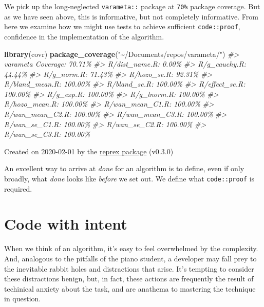 \documentclass[
]{article}
\newenvironment{Shaded}{\begin{snugshade}}{\end{snugshade}}
\newcommand{\CommentTok}[1]{\textcolor[rgb]{0.56,0.35,0.01}{\textit{#1}}}
\newcommand{\KeywordTok}[1]{\textcolor[rgb]{0.13,0.29,0.53}{\textbf{#1}}}
\newcommand{\NormalTok}[1]{#1}
\newcommand{\StringTok}[1]{\textcolor[rgb]{0.31,0.60,0.02}{#1}}
\begin{document}
We pick up the long-neglected \texttt{varameta::} package at
\texttt{70\%} package coverage. But as we have seen above, this is
informative, but not completely informative. From here we examine how we
might use tests to achieve sufficient \texttt{code::proof}, confidence
in the implementation of the algorithm.

\begin{Shaded}
\begin{Highlighting}[]
\KeywordTok{library}\NormalTok{(covr)}
\KeywordTok{package\_coverage}\NormalTok{(}\StringTok{"\textasciitilde{}/Documents/repos/varameta/"}\NormalTok{)}
\CommentTok{\#> varameta Coverage: 70.71\%}
\CommentTok{\#> R/dist\_name.R: 0.00\%}
\CommentTok{\#> R/g\_cauchy.R: 44.44\%}
\CommentTok{\#> R/g\_norm.R: 71.43\%}
\CommentTok{\#> R/hozo\_se.R: 92.31\%}
\CommentTok{\#> R/bland\_mean.R: 100.00\%}
\CommentTok{\#> R/bland\_se.R: 100.00\%}
\CommentTok{\#> R/effect\_se.R: 100.00\%}
\CommentTok{\#> R/g\_exp.R: 100.00\%}
\CommentTok{\#> R/g\_lnorm.R: 100.00\%}
\CommentTok{\#> R/hozo\_mean.R: 100.00\%}
\CommentTok{\#> R/wan\_mean\_C1.R: 100.00\%}
\CommentTok{\#> R/wan\_mean\_C2.R: 100.00\%}
\CommentTok{\#> R/wan\_mean\_C3.R: 100.00\%}
\CommentTok{\#> R/wan\_se\_C1.R: 100.00\%}
\CommentTok{\#> R/wan\_se\_C2.R: 100.00\%}
\CommentTok{\#> R/wan\_se\_C3.R: 100.00\%}
\end{Highlighting}
\end{Shaded}

Created on 2020-02-01 by the \href{https://reprex.tidyverse.org}{reprex
package} (v0.3.0)

An excellent way to arrive at \emph{done} for an algorithm is to define,
even if only broadly, what \emph{done} looks like \emph{before} we set
out. We define what \texttt{code::proof} is required.

\hypertarget{code-with-intent}{%
\section{Code with intent}\label{code-with-intent}}

When we think of an algorithm, it's easy to feel overwhelmed by the
complexity. And, analogous to the pitfalls of the piano student, a
developer may fall prey to the inevitable rabbit holes and distractions
that arise. It's tempting to consider these distractions benign, but, in
fact, these actions are frequently the result of techinical anxiety
about the task, and are anathema to mastering the technique in question.
\end{document}
